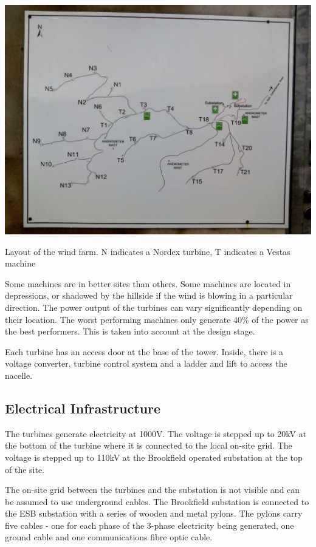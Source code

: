 \documentclass[12pt]{article} %
\begin{document}
\begin{center}
  \includegraphics[width=1\textwidth]{kilgarvan_layout}
\end{center}
\caption{Layout of the wind farm. N indicates a Nordex turbine, T indicates a Vestas machine}

Some machines are in better sites than others. Some machines are located in depressions, or shadowed by the hillside if the wind is blowing in a particular direction. The power output of the turbines can vary significantly depending on their location. The worst performing machines only generate 40\% of the power as the best performers. This is taken into account at the design stage.

Each turbine has an access door at the base of the tower. Inside, there is a voltage converter, turbine control system and a ladder and lift to access the nacelle.

\subsection{Electrical Infrastructure}
The turbines generate electricity at 1000V. The voltage is stepped up to 20kV at the bottom of the turbine where it is connected to the local on-site grid. The voltage is stepped up to 110kV at the Brookfield operated substation at the top of the site.

The on-site grid between the turbines and the substation is not visible and can be assumed to use underground cables.
The Brookfield substation is connected to the ESB substation with a series of wooden and metal pylons. The pylons carry five cables - one for each phase of the 3-phase electricity being generated, one ground cable and one communications fibre optic cable.
\end{document}
